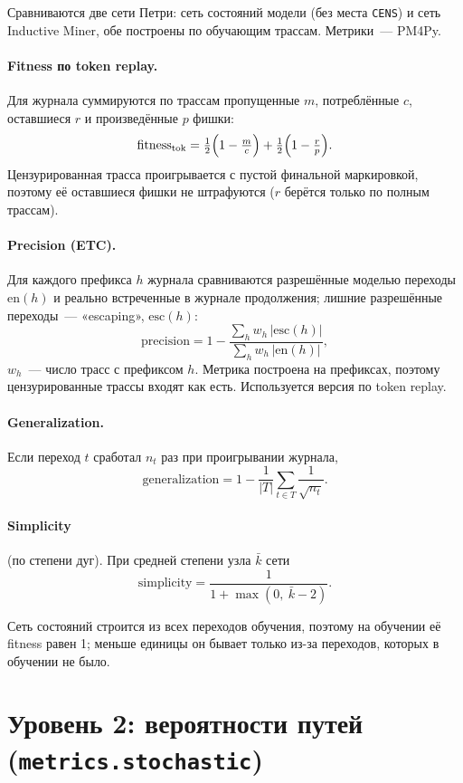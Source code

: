 \documentclass[11pt,a4paper]{article}
\newcommand{\code}[1]{\texttt{#1}}
\newcommand{\1}{\mathbf{1}}
\begin{document}
Сравниваются две сети Петри: сеть состояний модели (без места \code{CENS}) и сеть
Inductive Miner, обе построены по обучающим трассам. Метрики~--- PM4Py.

\paragraph{Fitness по token replay.} Для журнала суммируются по трассам
пропущенные $m$, потреблённые $c$, оставшиеся $r$ и произведённые $p$ фишки:
\[
\mathrm{fitness}_{\mathrm{tok}}=\tfrac12\Bigl(1-\tfrac{m}{c}\Bigr)+\tfrac12\Bigl(1-\tfrac{r}{p}\Bigr).
\]
Цензурированная трасса проигрывается с пустой финальной маркировкой,
поэтому её оставшиеся фишки не штрафуются ($r$ берётся только по полным трассам).

\paragraph{Precision (ETC).} Для каждого префикса $h$ журнала сравниваются разрешённые
моделью переходы $\mathrm{en}(h)$ и реально встреченные в журнале продолжения;
лишние разрешённые переходы~--- «escaping», $\mathrm{esc}(h)$:
\[
\mathrm{precision}=1-\frac{\sum_h w_h\,|\mathrm{esc}(h)|}{\sum_h w_h\,|\mathrm{en}(h)|},
\]
$w_h$~--- число трасс с префиксом $h$. Метрика построена на префиксах, поэтому
цензурированные трассы входят как есть. Используется версия по token replay.

\paragraph{Generalization.} Если переход $t$ сработал $n_t$ раз при проигрывании журнала,
\[
\mathrm{generalization}=1-\frac{1}{|T|}\sum_{t\in T}\frac{1}{\sqrt{n_t}}.
\]

\paragraph{Simplicity} (по степени дуг). При средней степени узла $\bar k$ сети
\[
\mathrm{simplicity}=\frac{1}{1+\max(0,\ \bar k-2)}.
\]

Сеть состояний строится из всех переходов обучения, поэтому на обучении её fitness равен 1;
меньше единицы он бывает только из-за переходов, которых в обучении не было.

\section{Уровень 2: вероятности путей (\code{metrics.stochastic})}
\end{document}
